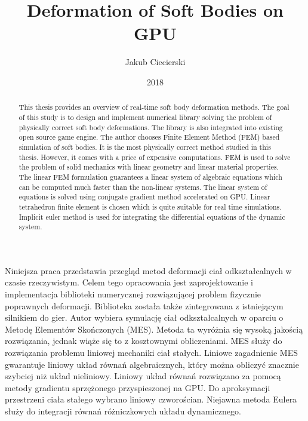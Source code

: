 \documentclass[en]{minipw} %
\title{Deformation of Soft Bodies on GPU} %
\author{Jakub Ciecierski}
\date{2018}
\begin{document}
\sloppy
\renewcommand{\figurename}{Figure}
\renewcommand{\contentsname}{Table of contents}






\setcounter{page}{1}

\begin{abstract}
This thesis provides an overview of real-time soft body deformation methods. The goal of this study is to design and implement numerical library solving the problem of physically correct soft body deformations. The library is also integrated into existing open source game engine. The author chooses Finite Element Method (FEM) based simulation of soft bodies. It is the most physically correct method studied in this thesis. However, it comes with a price of expensive computations. FEM is used to solve the problem of solid mechanics with linear geometry and linear material properties. The linear FEM formulation guarantees a linear system of algebraic equations which can be computed much faster than the non-linear systems. The linear system of equations is solved using conjugate gradient method accelerated on GPU. Linear tetrahedron finite element is chosen which is quite suitable for real time simulations. Implicit euler method is used for integrating the differential equations of the dynamic system.

\end{abstract}

\begin{streszczenie}
Niniejsza praca przedstawia przegląd metod deformacji ciał odkształcalnych w czasie rzeczywistym. Celem tego opracowania jest zaprojektowanie i implementacja biblioteki numerycznej rozwiązującej problem fizycznie poprawnych deformacji. Biblioteka została także zintegrowana z istniejącym silnikiem do gier. Autor wybiera symulację ciał odkształcalnych w oparciu o Metodę Elementów Skończonych (MES). Metoda ta wyróżnia się wysoką jakością rozwiązania, jednak wiąże się to z kosztownymi obliczeniami. MES służy do rozwiązania problemu liniowej mechaniki ciał stałych. Liniowe zagadnienie MES gwarantuje liniowy układ równań algebraicznych, który można obliczyć znacznie szybciej niż układ nieliniowy. Liniowy układ równań rozwiązano za pomocą metody gradientu sprzężonego przyspieszonej na GPU. Do aproksymacji przestrzeni ciała stałego wybrano liniowy czworościan. Niejawna metoda Eulera służy do integracji równań różniczkowych układu dynamicznego.

\end{streszczenie}
\end{document}
